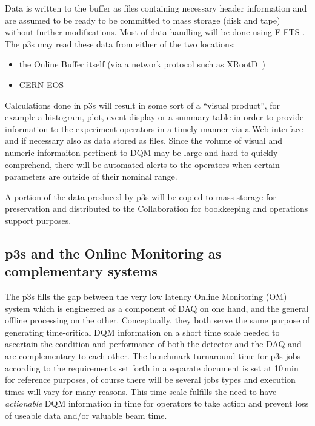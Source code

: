 \documentclass[pdftex,12pt,letter]{article}
\begin{document}
Data is written to the buffer as files containing
necessary header information and are assumed to be ready to be committed to mass
storage (disk and tape) without further modifications. Most of data handling will
be done using F-FTS \cite{docdb1212,fts}. The p3s may read these data from
either of the two locations:
\begin{itemize}
\item the Online Buffer itself (via a network protocol such as XRootD~\cite{xrootd})
\item CERN EOS~\cite{eos}
\end{itemize}

\noindent Calculations done in p3s 
will result in some sort of a ``visual product'', for example a histogram, plot, event display
or a summary table in order to provide information to the experiment operators in a timely manner
via a Web interface and if necessary also as data stored as files. 
Since the volume of visual and numeric informaiton pertinent to DQM may be large and hard
to quickly comprehend, there will be automated alerts to the operators when certain parameters
are outside of their nominal range.

A portion of the data produced by p3s will
be copied to mass storage for preservation and distributed to the Collaboration for
bookkeeping and operations support purposes.


\subsection{p3s and the Online Monitoring as complementary systems}
The p3s fills the gap between the very low latency Online Monitoring (OM)
system which is engineered as a component of DAQ on one hand, and
the general offline processing on the other. Conceptually, they both serve
the same purpose of generating time-critical DQM information on a short time
scale needed to ascertain the condition and performance of both the detector
and the DAQ and are complementary to each other. 
The benchmark turnaround time for p3s jobs 
according to the requirements set forth in a separate document 
\cite{docdb1811}  is set at 10\,min for reference purposes,
of course there will be several jobs types and execution times will
vary for many reasons. This time scale fulfills the need to have \textit{actionable}
DQM information in time for operators to take action and prevent loss
of useable data and/or valuable beam time.
\end{document}
